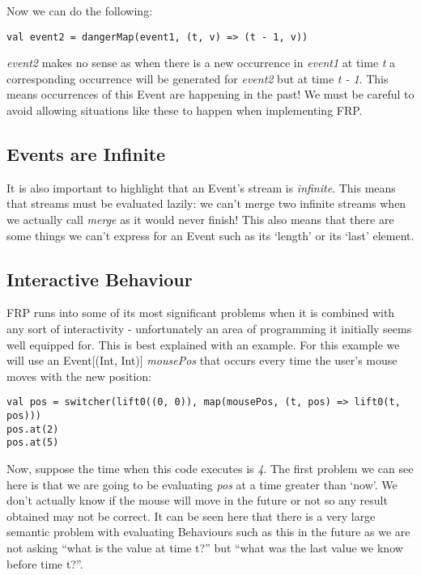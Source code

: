       Now we can do the following:
      
\begin{verbatim}
val event2 = dangerMap(event1, (t, v) => (t - 1, v))
\end{verbatim}

      \emph{event2} makes no sense as when there is a new occurrence in \emph{event1} at time 
      \emph{t} a corresponding occurrence will be generated for \emph{event2} but at time 
      \emph{t - 1}. This means occurrences of this Event are happening in the past! We must
      be careful to avoid allowing situations like these to happen when implementing FRP.
      
    \subsection{Events are Infinite}  
      It is also important to highlight that an Event's stream is \emph{infinite}. This means
      that streams must be evaluated lazily: we can't merge two infinite streams when we actually
      call \emph{merge} as it would never finish! This also means that there are some things we
      can't express for an Event such as its `length' or its `last' element.
    
      
    \subsection{Interactive Behaviour}
      FRP runs into some of its most significant problems when it is combined with any
      sort of interactivity - unfortunately an area of programming it initially seems
      well equipped for. This is best explained with an example. For this example we will use an 
      Event[(Int, Int)] \emph{mousePos} that occurs every time the user's mouse moves with the new position:

\begin{verbatim}
val pos = switcher(lift0((0, 0)), map(mousePos, (t, pos) => lift0(t, pos)))
pos.at(2)
pos.at(5)
\end{verbatim}    

      Now, suppose the time when this code executes is \emph{4}. The first problem we can see here
      is that we are going to be evaluating \emph{pos} at a time greater than `now'. We don't
      actually know if the mouse will move in the future or not so any result obtained may not
      be correct. It can be seen here that there is a very large semantic problem with evaluating
      Behaviours such as this in the future as we are not asking ``what is the value at time t?''
      but ``what was the last value we know before time t?''. 
      
